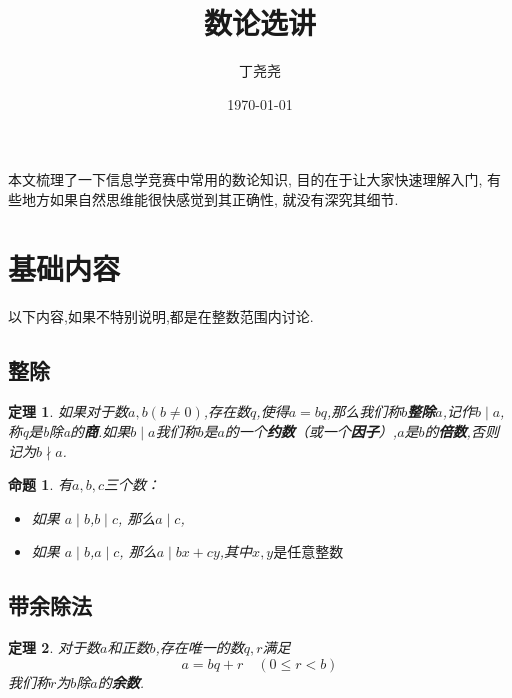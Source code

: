 \documentclass{article}
\title{数论选讲}
\author{丁尧尧}
\date{\today}
\newtheorem{theorem}{定理}
\newtheorem{prop}{命题}
\begin{document}
	\maketitle
	
	\newpage

	\tableofcontents

	\newpage	
	
	\begin{center}
		本文梳理了一下信息学竞赛中常用的数论知识, 目的在于让大家快速理解入门, 有些地方如果自然思维能很快感觉到其正确性, 就没有深究其细节.
	\end{center}
	
	\newpage
	
	\section{基础内容}
		以下内容,如果不特别说明,都是在整数范围内讨论.
	\subsection{整除}

		\begin{theorem}
			如果对于数$ a,b(b \neq 0) $,存在数$ q $,使得$ a = b q $,那么我们称$ b $\textbf{整除}$ a $,记作$ b \mid a $,称q是b除a的\textbf{商}.如果$ b \mid a $我们称$ b $是$ a $的一个\textbf{约数}（或一个\textbf{因子}）,$ a $是$ b $的\textbf{倍数},否则记为$ b \nmid a $.
		\end{theorem} 

		\begin{prop}
			有$a,b,c$三个数：
			\begin{itemize}
				\item 如果 $ a \mid b $,$b \mid c$, 那么$a \mid c$,
				\item 如果 $ a \mid b $,$a \mid c$, 那么$a \mid bx + cy$,其中$x,y是任意整数$
			\end{itemize}
		\end{prop}
		
	\subsection{带余除法}
	
		\begin{theorem}
			对于数$ a  $和正数$ b $,存在唯一的数$ q,r $满足
			$$ 			a = b  q + r \quad  (0 \leq r < b)			$$
			我们称$ r $为$ b $除$ a $的\textbf{余数}.
		\end{theorem}
\end{document}
